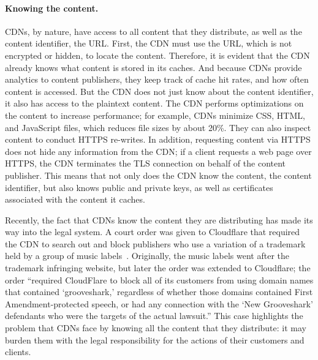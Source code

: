 \paragraph{Knowing the content.}  CDNs, by nature, have access to all content that they distribute, as well as the 
content identifier, the URL.  First, the CDN must use the URL, which is not 
encrypted or hidden, to locate the content. Therefore, it is evident that the CDN already knows what content is 
stored in its caches.  And because CDNs provide analytics to content publishers, they keep track of cache hit 
rates, and how often content is accessed.  But the CDN does not just know about the content identifier, it also 
has access to the plaintext content.  The CDN performs optimizations on the content to increase performance; 
for example, CDNs minimize CSS, HTML, and JavaScript files, which reduces file sizes by about 20\%.  They can 
also inspect content to conduct HTTPS re-writes. In addition, requesting content via HTTPS does not hide any information 
from the CDN; if a client requests a web page over HTTPS, the CDN terminates the TLS connection on behalf of the 
content publisher.  This means that not only does the CDN know the content, the content identifier, but also knows 
public and private keys, as well as certificates associated with the content it caches.  

Recently, the fact that CDNs 
know the content they are distributing has made its way into the legal system.  A court order was given to Cloudflare 
that required the CDN to search out and block publishers who use a variation of a trademark held by a group of 
music labels~\cite{eff_cloudflare_trademark}.  Originally, the music labels went after the trademark infringing 
website, but later the order was extended to Cloudflare; the order ``required CloudFlare to block all of its customers 
from using domain names that contained `grooveshark,' regardless of whether those domains contained First 
Amendment-protected speech, or had any connection with the `New Grooveshark' defendants who were the 
targets of the actual lawsuit.''  This case highlights the problem that CDNs face by knowing all the content 
that they distribute: it may burden them with the legal responsibility for the actions of their customers 
and clients.

